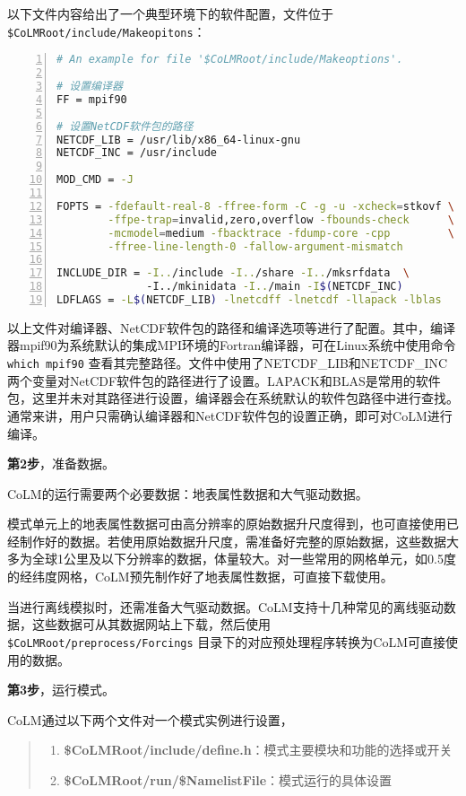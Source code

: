 \documentclass[a4paper,12pt,twoside]{article}
\begin{document}
以下文件内容给出了一个典型环境下的软件配置，文件位于\texttt{\$CoLMRoot/include/\allowbreak Makeopitons}：
\begin{lstlisting}[language=bash, basicstyle=\linespread{1.2}\small\ttfamily, commentstyle=\color{olive}, numbers=left, numberstyle=\tiny, xleftmargin=1.5em,xrightmargin=0em, aboveskip=1em]
# An example for file '$CoLMRoot/include/Makeoptions'.

# 设置编译器
FF = mpif90

# 设置NetCDF软件包的路径
NETCDF_LIB = /usr/lib/x86_64-linux-gnu
NETCDF_INC = /usr/include

MOD_CMD = -J

FOPTS = -fdefault-real-8 -ffree-form -C -g -u -xcheck=stkovf \
        -ffpe-trap=invalid,zero,overflow -fbounds-check      \
        -mcmodel=medium -fbacktrace -fdump-core -cpp         \
        -ffree-line-length-0 -fallow-argument-mismatch

INCLUDE_DIR = -I../include -I../share -I../mksrfdata  \ 
              -I../mkinidata -I../main -I$(NETCDF_INC)
LDFLAGS = -L$(NETCDF_LIB) -lnetcdff -lnetcdf -llapack -lblas

\end{lstlisting}

以上文件对编译器、NetCDF软件包的路径和编译选项等进行了配置。其中，编译器mpif90为系统默认的集成MPI环境的Fortran编译器，可在Linux系统中使用命令 \texttt{which mpif90} 查看其完整路径。文件中使用了NETCDF\_LIB和NETCDF\_INC两个变量对NetCDF软件包的路径进行了设置。LAPACK和BLAS是常用的软件包，这里并未对其路径进行设置，编译器会在系统默认的软件包路径中进行查找。通常来讲，用户只需确认编译器和NetCDF软件包的设置正确，即可对CoLM进行编译。

\textbf{第2步}，准备数据。

CoLM的运行需要两个必要数据：地表属性数据和大气驱动数据。

模式单元上的地表属性数据可由高分辨率的原始数据升尺度得到，也可直接使用已经制作好的数据。若使用原始数据升尺度，需准备好完整的原始数据，这些数据大多为全球1公里及以下分辨率的数据，体量较大。对一些常用的网格单元，如0.5度的经纬度网格，CoLM预先制作好了地表属性数据，可直接下载使用。

当进行离线模拟时，还需准备大气驱动数据。CoLM支持十几种常见的离线驱动数据，这些数据可从其数据网站上下载，然后使用 \texttt{\$CoLMRoot/preprocess/Forcings} 目录下的对应预处理程序转换为CoLM可直接使用的数据。

\textbf{第3步}，运行模式。

CoLM通过以下两个文件对一个模式实例进行设置，
\begin{quote}
\begin{enumerate}[1)]
    \item \textbf{\$CoLMRoot/include/define.h}：模式主要模块和功能的选择或开关
    \item \textbf{\$CoLMRoot/run/\$NamelistFile}：模式运行的具体设置
\end{enumerate}
\end{quote}
\end{document}
